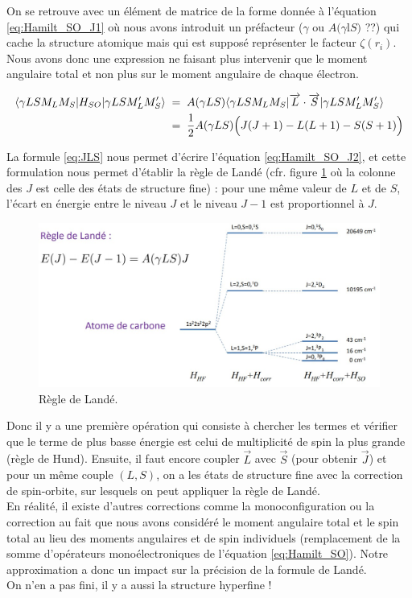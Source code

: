 On se retrouve avec un élément de matrice de la forme donnée à l'équation \eqref{eq:Hamilt_SO_J1} où nous avons introduit un préfacteur ($\gamma$ ou $A(\gamma $l$ S)$ ??) qui cache la structure atomique mais qui est supposé représenter le facteur $\zeta(r_i)$. Nous avons donc une expression ne faisant plus intervenir que le moment angulaire total et non plus sur le moment angulaire de chaque électron.

\begin{align}
    \langle \gamma LSM_LM_S|H_{SO}|\gamma LSM_L'M_S' \rangle &\; = \;  A(\gamma LS)\langle \gamma LSM_LM_S|\overrightarrow{L}\cdot\overrightarrow{S}|\gamma LSM_L'M_S' \rangle
    \label{eq:Hamilt_SO_J1}    \\
    &\; = \;
    \dfrac{1}{2}A(\gamma LS)\Big( J(J+1)-L(L+1)-S(S+1)\Big)
    \label{eq:Hamilt_SO_J2}
\end{align}

La formule \eqref{eq:JLS} nous permet d’écrire l'équation \eqref{eq:Hamilt_SO_J2}, et cette formulation nous permet d'établir la règle de Landé (cfr. figure \ref{fig:RegleLandé} où la colonne des $J$ est celle des états de structure fine) : pour une même valeur de $L$ et de $S$, l’écart en énergie entre le niveau $J$ et le niveau $J-1$ est proportionnel à $J$.

\begin{figure}[tph]
    \centering
    \includegraphics[scale=0.50]{Images2/regleLande.jpg}
    \caption{Règle de Landé.}
    \label{fig:RegleLandé}
\end{figure}

Donc il y a une première opération qui consiste à chercher les termes et vérifier que le terme de plus basse énergie est celui de multiplicité de spin la plus grande (règle de Hund). Ensuite, il faut encore coupler $\overrightarrow{L}$ avec $\overrightarrow{S}$ (pour obtenir $\overrightarrow{J}$) et pour un même couple $(L,S)$, on a les états de structure fine avec la correction de spin-orbite, sur lesquels on peut appliquer la règle de Landé.\\
En réalité, il existe d'autres corrections comme la monoconfiguration ou la correction au fait que nous avons considéré le moment angulaire total et le spin total au lieu des moments angulaires et de spin individuels (remplacement de la somme d'opérateurs monoélectroniques de l'équation \eqref{eq:Hamilt_SO}). Notre approximation a donc un impact sur la précision de la formule de Landé.\\
On n’en a pas fini, il y a aussi la structure hyperfine !

